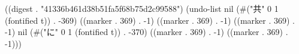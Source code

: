 
((digest . "41336b461d38b51fa5f68b75d2c99588") (undo-list nil (#("共" 0 1 (fontified t)) . -369) ((marker . 369) . -1) ((marker . 369) . -1) ((marker . 369) . -1) nil (#("に" 0 1 (fontified t)) . -370) ((marker . 369) . -1) ((marker . 369) . -1)))
